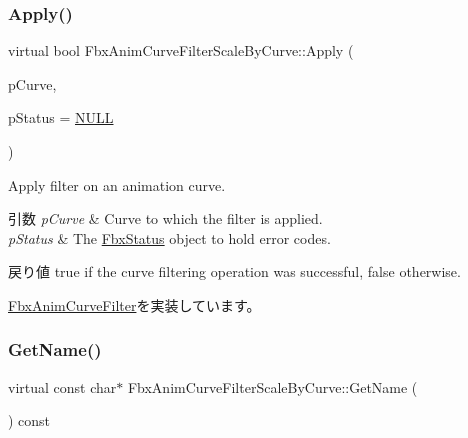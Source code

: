 \mbox{\label{class_fbx_anim_curve_filter_scale_by_curve_a3914c0e65233ce6f2177d5d7e65c15ea}} 
\subsubsection{\texorpdfstring{Apply()}{Apply()}\hspace{0.1cm}{\footnotesize\ttfamily [5/5]}}
{\footnotesize\ttfamily virtual bool Fbx\+Anim\+Curve\+Filter\+Scale\+By\+Curve\+::\+Apply (\begin{DoxyParamCaption}\item[{\hyperlink{class_fbx_anim_curve}{Fbx\+Anim\+Curve} \&}]{p\+Curve,  }\item[{\hyperlink{class_fbx_status}{Fbx\+Status} $\ast$}]{p\+Status = {\ttfamily \hyperlink{fbxarch_8h_a070d2ce7b6bb7e5c05602aa8c308d0c4}{N\+U\+LL}} }\end{DoxyParamCaption})\hspace{0.3cm}{\ttfamily [virtual]}}

Apply filter on an animation curve. 
\begin{DoxyParams}{引数}
{\em p\+Curve} & Curve to which the filter is applied. \\
\hline
{\em p\+Status} & The \hyperlink{class_fbx_status}{Fbx\+Status} object to hold error codes. \\
\hline
\end{DoxyParams}
\begin{DoxyReturn}{戻り値}
{\ttfamily true} if the curve filtering operation was successful, {\ttfamily false} otherwise. 
\end{DoxyReturn}


\hyperlink{class_fbx_anim_curve_filter_a6a69996c47c0e6f63a0f8b0d5fa806a0}{Fbx\+Anim\+Curve\+Filter}を実装しています。

\mbox{\label{class_fbx_anim_curve_filter_scale_by_curve_a99e99cf6db71774d394010c4cd295fdb}} 
\subsubsection{\texorpdfstring{Get\+Name()}{GetName()}}
{\footnotesize\ttfamily virtual const char$\ast$ Fbx\+Anim\+Curve\+Filter\+Scale\+By\+Curve\+::\+Get\+Name (\begin{DoxyParamCaption}{ }\end{DoxyParamCaption}) const\hspace{0.3cm}{\ttfamily [virtual]}}

